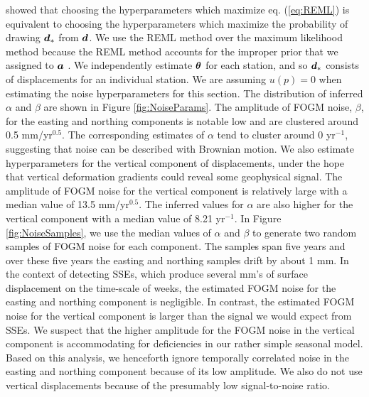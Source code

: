 \documentclass[extra,mreferee]{gji}
\begin{document}
\citet{Harville1974} showed that choosing the hyperparameters which maximize eq. (\ref{eq:REML}) is equivalent to choosing the hyperparameters which maximize the probability of drawing $\mitbf{d}_*$ from $\mitbf{d}$. We use the REML method over the maximum likelihood method \citep[e.g.,][]{Langbein1997} because the REML method accounts for the improper prior that we assigned to $\mitbf{a}$ \citep{Hines2017}. We independently estimate $\mitbf{\theta}$ for each station, and so $\mitbf{d}_*$ consists of displacements for an individual station. We are assuming $u(p)=0$ when estimating the noise hyperparameters for this section. The distribution of inferred $\alpha$ and $\beta$ are shown in Figure \ref{fig:NoiseParams}. The amplitude of FOGM noise, $\beta$, for the easting and northing components is notable low and are clustered around 0.5 mm/yr$^{0.5}$. The corresponding estimates of $\alpha$ tend to cluster around 0 yr$^{-1}$, suggesting that noise can be described with Brownian motion. We also estimate hyperparameters for the vertical component of displacements, under the hope that vertical deformation gradients could reveal some geophysical signal. The amplitude of FOGM noise for the vertical component is relatively large with a median value of 13.5 mm/yr$^{0.5}$.  The inferred values for $\alpha$ are also higher for the vertical component with a median value of 8.21 yr$^{-1}$. In Figure \ref{fig:NoiseSamples}, we use the median values of $\alpha$ and $\beta$ to generate two random samples of FOGM noise for each component. The samples span five years and over these five years the easting and northing samples drift by about 1 mm. In the context of detecting SSEs, which produce several mm's of surface displacement on the time-scale of weeks, the estimated FOGM noise for the easting and northing component is negligible. In contrast, the estimated FOGM noise for the vertical component is larger than the signal we would expect from SSEs. We suspect that the higher amplitude for the FOGM noise in the vertical component is accommodating for deficiencies in our rather simple seasonal model. Based on this analysis, we henceforth ignore temporally correlated noise in the easting and northing component because of its low amplitude. We also do not use vertical displacements because of the presumably low signal-to-noise ratio.
\end{document}

